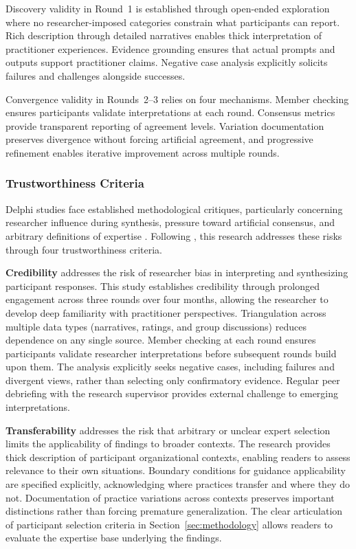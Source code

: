 Discovery validity in Round~1 is established through open-ended exploration
where no researcher-imposed categories constrain what participants can report.
Rich description through detailed narratives enables thick interpretation of
practitioner experiences. Evidence grounding ensures that actual prompts and
outputs support practitioner claims. Negative case analysis explicitly solicits
failures and challenges alongside successes.

Convergence validity in Rounds~2--3 relies on four mechanisms. Member checking
ensures participants validate interpretations at each round. Consensus metrics
provide transparent reporting of agreement levels. Variation documentation
preserves divergence without forcing artificial agreement, and progressive
refinement enables iterative improvement across multiple rounds.

\subsubsection{Trustworthiness Criteria}

Delphi studies face established methodological critiques, particularly
concerning researcher influence during synthesis, pressure toward artificial
consensus, and arbitrary definitions of expertise
\parencite{linstone_delphi_1975, okoli_delphi_2004}. Following
\textcite{lincoln_naturalistic_1985}, this research addresses these risks
through four trustworthiness criteria.

\textbf{Credibility} addresses the risk of researcher bias in interpreting and
synthesizing participant responses. This study establishes credibility through
prolonged engagement across three rounds over four months, allowing the researcher
to develop deep familiarity with practitioner perspectives. Triangulation across
multiple data types (narratives, ratings, and group discussions) reduces
dependence on any single source. Member checking at each round ensures
participants validate researcher interpretations before subsequent rounds build
upon them. The analysis explicitly seeks negative cases, including failures and
divergent views, rather than selecting only confirmatory evidence. Regular peer
debriefing with the research supervisor provides external challenge to emerging
interpretations.

\textbf{Transferability} addresses the risk that arbitrary or unclear expert
selection limits the applicability of findings to broader contexts. The research
provides thick description of participant organizational contexts, enabling
readers to assess relevance to their own situations. Boundary conditions for
guidance applicability are specified explicitly, acknowledging where practices transfer and where they do not. Documentation of practice variations across contexts
preserves important distinctions rather than forcing premature generalization.
The clear articulation of participant selection criteria in
Section~\ref{sec:methodology} allows readers to evaluate the expertise base
underlying the findings.

